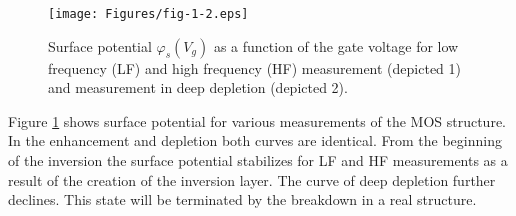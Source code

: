 \begin{figure}[h!]\centering
\texttt{[image: Figures/fig-1-2.eps]}
\captionsetup{justification=raggedright, singlelinecheck=false}
\iffalse
\caption[Priebeh povrchového potenciálu $\varphi_s(V_g)$ ako funkcie
  napätia hradla]{Priebeh povrchového potenciálu $\varphi_s(V_g)$ ako
  funkcie napätia hradla pre nízkofrekvenčné (LF) a vysokofrekvenčné
  (HF) meranie (označený 1) a pre meranie v stave hlbokého
  ochudobnenia (označený 2).}
\fi
\caption[Surface potential $\varphi_s(V_g)$ as a function of the gate
  voltage]{Surface potential $\varphi_s(V_g)$ as a function of the
  gate voltage for low frequency (LF) and high frequency (HF)
  measurement (depicted 1) and measurement in deep depletion (depicted
  2).}
\label{fig:1.2}
\end{figure}

\iffalse \par Na obrázku \ref{fig:1.2} sú znázornené priebehy
povrchového potenciálu pre rôzne režimy merania štruktúry MOS. V
oblasti obohatenia a ochudobnenia sú obidva priebehy rovnaké. Od
počiatku inverzie sa povrchový potenciál pre LF a HF meranie ustaľuje
v dôsledku vytvárania inverznej vrstvy.  Krivka hlbokého ochudobnenia
ďalej klesá. Tento stav sa v reálnej štruktúre ukončí elektrickým
prierazom.
\fi

\par Figure \ref{fig:1.2} shows surface potential for various
measurements of the MOS structure. In the enhancement and depletion
both curves are identical. From the beginning of the inversion the
surface potential stabilizes for LF and HF measurements as a result of
the creation of the inversion layer. The curve of deep depletion
further declines. This state will be terminated by the breakdown in a
real structure.

